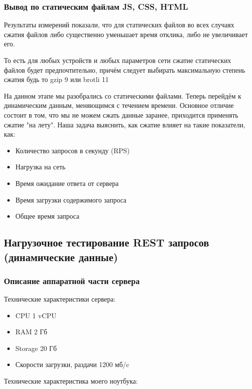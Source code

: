 \documentclass[12pt]{article}
\begin{document}
\subsubsection{Вывод по статическим файлам JS, CSS, HTML}

Результаты измерений показали, что для статических файлов во всех случаях сжатия файлов либо существенно уменьшает время отклика, либо не увеличивает его.

То есть для любых устройств и любых параметров сети сжатие статических файлов будет предпочтительно, причём следует выбирать максимальную степень сжатия будь то gzip 9 или brotli 11

На данном этапе мы разобрались со статическими файлами. Теперь перейдём к динамическим данным, меняющимся с течением времени. Основное отличие состоит в том, что мы не можем сжать данные заранее, приходится применять сжатие "на лету". Наша задача  выяснить, как сжатие влияет на такие показатели, как:

\begin{itemize}
    \item Количество запросов в секунду (RPS)
    \item Нагрузка на сеть
    \item Время ожидание ответа от сервера
    \item Время загрузки содержимого запроса
    \item Общее время запроса
\end{itemize}

\subsection{Нагрузочное тестирование REST запросов (динамические данные)}

\subsubsection{Описание аппаратной части сервера}

Технические характеристики сервера:

\begin{itemize}
    \item CPU 1 vCPU
    \item RAM 2 Гб
    \item Storage 20 Гб
    \item Скорости загрузки, раздачи 1200 мб/c
\end{itemize}

Технические характеристика моего ноутбука:
\end{document}
